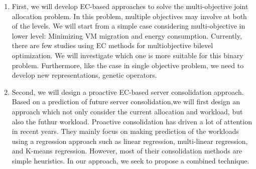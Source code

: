 \begin{enumerate}
	\item First, we will develop EC-based approaches to solve the multi-objective joint allocation problem. In this problem, multiple objectives may involve at both of the levels. We will start from a simple case considering multi-objective in lower level: Minimizing VM migration and energy consumption.  Currently,  there are few studies using EC methods \cite{Yin:2000bt, Deb:2010in} for multiobjective bilevel optimization. We will investigate which one is more suitable for this binary problem. Furthermore, like the case in single objective problem, we need to develop new representations, genetic operators.

	\item Second, we will design a proactive EC-based server consolidation approach. Based on a prediction of future server consolidation,we will first design an approach which not only consider the current allocation and workload, but also the futhur workload. Proactive consolidation \cite{Farahnakian:2015vj, Tan:2011jd} has driven a lot of attention in recent years. They mainly focus on making prediction of the workloads using a regression approach such as linear regression, multi-linear regression, and K-means regression. However, most of their consolidation methods are simple heuristics. In our approach, we seek to propose a combined technique.

	

	

	\end{enumerate}

